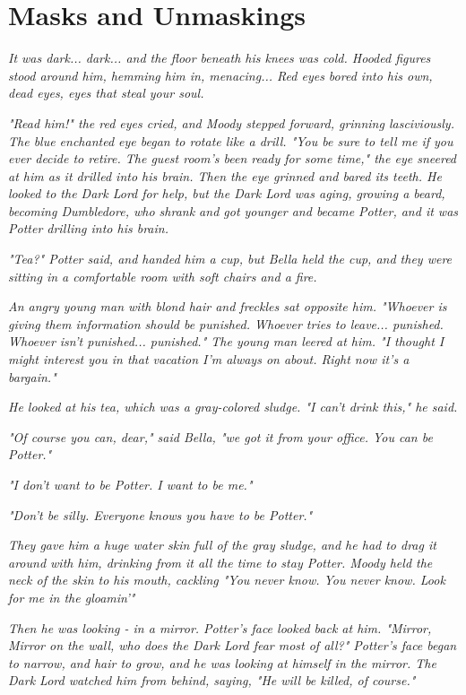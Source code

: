 
\chapter{Masks and Unmaskings}

\emph{It was dark... dark... and the floor beneath his knees was cold. Hooded figures stood around him, hemming him in, menacing... Red eyes bored into his own, dead eyes, eyes that steal your soul.}

\emph{"Read him!" the red eyes cried, and Moody stepped forward, grinning lasciviously. The blue enchanted eye began to rotate like a drill. "You be sure to tell me if you ever decide to retire. The guest room's been ready for some time," the eye sneered at him as it drilled into his brain. Then the eye grinned and bared its teeth. He looked to the Dark Lord for help, but the Dark Lord was aging, growing a beard, becoming Dumbledore, who shrank and got younger and became Potter, and it was Potter drilling into his brain.}

\emph{"Tea?" Potter said, and handed him a cup, but Bella held the cup, and they were sitting in a comfortable room with soft chairs and a fire.}

\emph{An angry young man with blond hair and freckles sat opposite him. "Whoever is giving them information should be punished. Whoever tries to leave... punished. Whoever isn't punished... punished." The young man leered at him. "I thought I might interest you in that vacation I'm always on about. Right now it's a bargain."}

\emph{He looked at his tea, which was a gray-colored sludge. "I can't drink this," he said.}

\emph{"Of course you can, dear," said Bella, "we got it from your office. You can be Potter."}

\emph{"I don't want to be Potter. I want to be me."}

\emph{"Don't be silly. Everyone knows you have to be Potter."}

\emph{They gave him a huge water skin full of the gray sludge, and he had to drag it around with him, drinking from it all the time to stay Potter. Moody held the neck of the skin to his mouth, cackling "You never know. You never know. Look for me in the gloamin'"}

\emph{Then he was looking - in a mirror. Potter's face looked back at him. "Mirror, Mirror on the wall, who does the Dark Lord fear most of all?" Potter's face began to narrow, and hair to grow, and he was looking at himself in the mirror. The Dark Lord watched him from behind, saying, "He will be killed, of course."}

